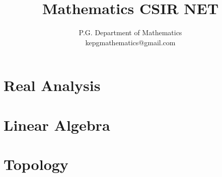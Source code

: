 \documentclass[a4paper,12pt,openany]{book}
\title{Mathematics CSIR NET}
\author{P.G. Department of Mathematics\\ kepgmathematics@gmail.com}
\date{}
\begin{document}
 \part{Real Analysis}
 
 
 
 
 
 
 
 
 

 \part{Linear Algebra}
 
 
 
 
 
 

%
%
%
%

%

%

%
%
%
%
%

\part{Topology}


%
%

%
%
\end{document}
